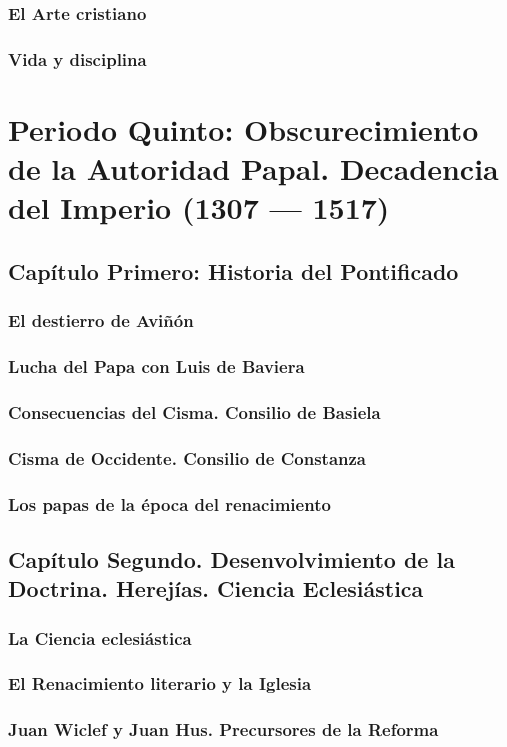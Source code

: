 \raggedbottom{} \documentclass[12pt, a4paper, openany]{book} %
\begin{document}
\section{El Arte cristiano}
\section{Vida y disciplina}
\part{Periodo Quinto: Obscurecimiento de la Autoridad Papal. Decadencia del Imperio (1307 --- 1517)}
\chapter{Capítulo Primero: Historia del Pontificado}
\section{El destierro de Aviñón}
\section{Lucha del Papa con Luis de Baviera}
\section{Consecuencias del Cisma. Consilio de Basiela}
\section{Cisma de Occidente. Consilio de Constanza}
\section{Los papas de la época del renacimiento}
\chapter{Capítulo Segundo. Desenvolvimiento de la Doctrina. Herejías. Ciencia Eclesiástica}
\section{La Ciencia eclesiástica}
\section{El Renacimiento literario y la Iglesia}
\section{Juan Wiclef y Juan Hus. Precursores de la Reforma}
\end{document}
